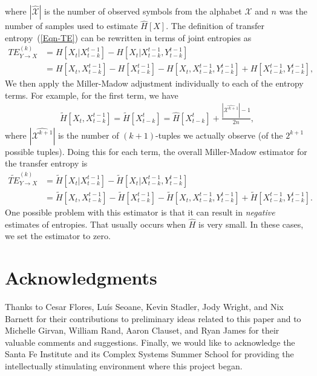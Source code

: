 \documentclass[10pt,letterpaper]{article}
\begin{document}
	where $|\mathcal{\hat{X}}|$ is the number of observed symbols from the alphabet $\mathcal{X}$ and $n$ was the number of samples used to estimate $\hat{H}[X].$ The definition of transfer entropy~(\ref{Eqn-TE}) can be rewritten in terms of joint entropies as
	\begin{align}
		TE_{Y \to X}^{(k)} &= H[X_t | X_{t-k}^{t-1}] - H[X_t | X_{t-k}^{t-1},Y_{t-k}^{t-1}] \\ 
		&= H[X_t,X_{t-k}^{t-1}]-H[X_{t-k}^{t-1}]-H[X_t,X_{t-k}^{t-1},Y_{t-k}^{t-1}]+H[X_{t-k}^{t-1},Y_{t-k}^{t-1}],
	\end{align}
	We then apply the Miller-Madow adjustment individually to each of the entropy terms. For example, for the first term, we have
	\begin{align}
		\tilde{H}[X_{t}, X_{t - k}^{t-1}] = \tilde{H}[X_{t - k}^{t}] = \hat{H}[X_{t-k}^{t}] + \frac{|\widehat{\mathcal{X}^{k+1}}| - 1}{2n},
	\end{align}
	where $|\widehat{\mathcal{X}^{k+1}}|$ is the number of $(k + 1)$-tuples we actually observe (of the $2^{k + 1}$ possible tuples). Doing this for each term, the overall Miller-Madow estimator for the transfer entropy is
	\begin{align}
		\widetilde{TE}_{Y \to X}^{(k)} &= \tilde{H}[X_t | X_{t-k}^{t-1}] - \tilde{H}[X_t | X_{t-k}^{t-1},Y_{t-k}^{t-1}] \\ 
		&= \tilde{H}[X_t,X_{t-k}^{t-1}]-\tilde{H}[X_{t-k}^{t-1}]-\tilde{H}[X_t,X_{t-k}^{t-1},Y_{t-k}^{t-1}]+\tilde{H}[X_{t-k}^{t-1},Y_{t-k}^{t-1}].
	\end{align}
	One possible problem with this estimator is that it can result in \emph{negative} estimates of entropies. That usually occurs when $\hat{H}$ is very small. In these cases, we set the estimator to zero.

\section*{Acknowledgments}

Thanks to Cesar Flores, Lu\'is Seoane, Kevin Stadler, Jody Wright, and Nix Barnett for their contributions to preliminary ideas related to this paper and to Michelle Girvan, William Rand, Aaron Clauset, and Ryan James for their valuable comments and suggestions. Finally, we would like to acknowledge the Santa Fe Institute and its Complex Systems Summer School for providing the intellectually stimulating environment where this project began.
\end{document}
